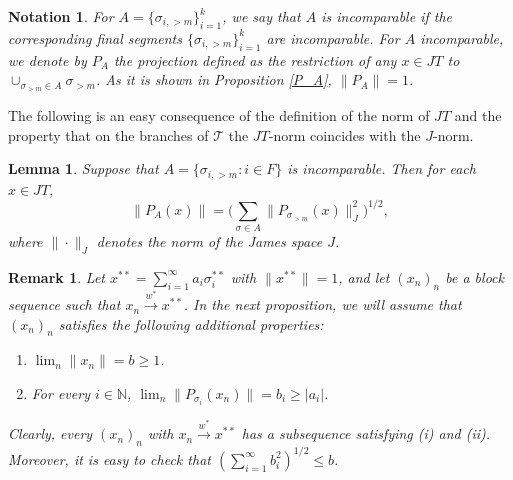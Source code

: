 \documentclass[12pt]{amsart}
\theoremstyle{plain}
\numberwithin{equation}{section}
\newcommand{\N}{\mathbb{N}}
\newcommand{\s}{\sigma}
\newcommand{\Tree}{\mathcal{T}}
\newtheorem{lemma}[theorem]{Lemma}
\newtheorem{remark}[theorem]{Remark}
\newtheorem{notation}[theorem]{Notation}
\begin{document}
\begin{notation}
For $A = \{\s_{i, >m}\}_{i=1}^k$, we say that $A$ is incomparable if the corresponding final segments $\{\s_{i, >m}\}_{i=1}^k$ are incomparable. For $A$ incomparable, we denote by $P_A$ the projection defined as the restriction of any $x\in JT$ to $\cup_{\s_{>m} \in A} \s_{>m}$. As it is shown in Proposition \ref{P_A}, $\|P_A\| = 1$.
\end{notation}

The following is an easy consequence of the definition of the norm of $JT$ and the property that on the branches of $\Tree$ the $JT$-norm coincides with the $J$-norm.

\begin{lemma}\label{L8}
Suppose that $A = \{ \s_{i,>m} : i\in F\}$ is incomparable. Then for each $x\in JT$,
\[ \|P_A(x)\| = \Big( \sum_{\s \in A} \|P_{\s_{> m}}(x)\|_J^2 \Big)^{1/2}, \]
where $\|\cdot\|_J$ denotes the norm of the James space $J$.
\end{lemma}

\begin{remark}\label{R1}
Let $x^{**} = \sum_{i=1}^\infty a_i\s_i^{**}$ with  $\|x^{**}\| = 1$, and let $(x_n)_n$ be a block sequence such that $x_n \xrightarrow{w^*} x^{**}$. In the next proposition, we will assume that $(x_n)_n$ satisfies the following additional properties:
\begin{enumerate}
    \item[i)] $\lim_n \|x_n\| = b \geq 1$.
    \item[ii)] For every $i \in \N$, $\lim_n \|P_{\s_i}(x_n)\| = b_i \geq |a_i|$.
\end{enumerate}
Clearly, every $(x_n)_n$ with $x_n \xrightarrow{w^*} x^{**}$ has a subsequence satisfying (i) and (ii). Moreover, it is easy to check that $(\sum_{i=1}^\infty b_i^2)^{1/2} \leq b$.
\end{remark}
\end{document}
